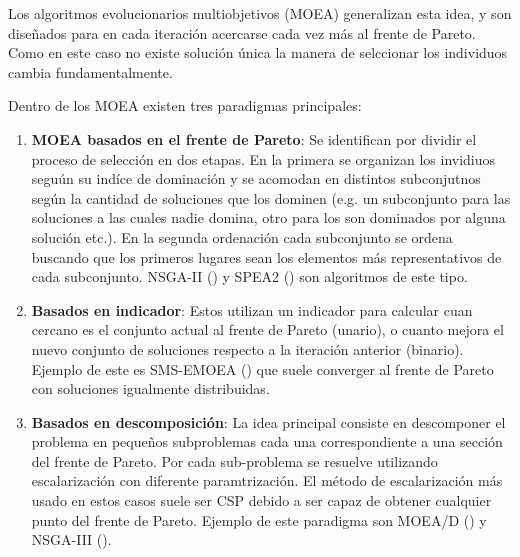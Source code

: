 Los algoritmos evolucionarios multiobjetivos (MOEA) generalizan esta idea, y son diseñados para en cada iteraci\'on acercarse cada vez m\'as al frente de Pareto. Como en este caso no existe soluci\'on \'unica la manera de selccionar los individuos cambia fundamentalmente.

Dentro de los MOEA existen tres paradigmas principales:
\begin{enumerate}
    \item \textbf{MOEA basados en el frente de Pareto}: Se identifican por dividir el proceso de selecci\'on en dos etapas. En la primera se organizan los invidiuos segu\'un su ind\'ice de dominaci\'on y se acomodan en distintos subconjutnos seg\'un la cantidad de soluciones que los dominen (e.g. un subconjunto para las soluciones a las cuales nadie domina, otro para los son dominados por alguna soluci\'on etc.). En la segunda ordenaci\'on cada subconjunto se ordena buscando que los primeros lugares sean los elementos m\'as representativos de cada subconjunto. NSGA-II (\cite{deb2002fast}) y SPEA2 (\cite{zitzler1999multiobjective}) son algoritmos de este tipo.

    \item \textbf{Basados en indicador}: Estos utilizan un indicador para calcular cuan cercano es el conjunto actual al frente de Pareto (unario), o cuanto mejora el nuevo conjunto de soluciones respecto a la iteraci\'on anterior (binario). Ejemplo de este es SMS-EMOEA (\cite{emmerich2005emo}) que suele converger al frente de Pareto con soluciones igualmente distribuidas.

    \item \textbf{Basados en descomposici\'on}: La idea principal consiste en descomponer el problema en pequeños subproblemas cada una correspondiente a una secci\'on del frente de Pareto. Por cada sub-problema se resuelve utilizando escalarizaci\'on con diferente paramtrizaci\'on. El m\'etodo de escalarizaci\'on m\'as usado en estos casos suele ser CSP debido a ser capaz de obtener cualquier punto del frente de Pareto. Ejemplo de este paradigma son MOEA/D (\cite{zhang2007moea}) y NSGA-III (\cite{deb2013evolutionary}).

\end{enumerate}


